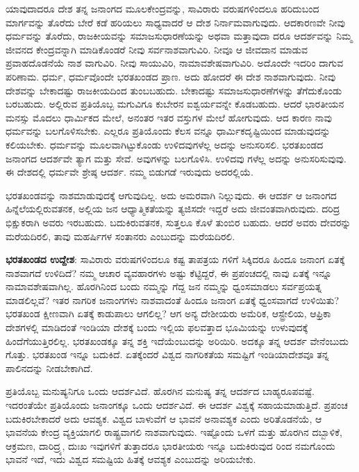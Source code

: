 ಯಾವುದಾದರೂ ದೇಶ ತನ್ನ ಜನಾಂಗದ ಮೂಲಕೇಂದ್ರವನ್ನು, ಸಾವಿರಾರು ವರುಷಗಳಿಂದಲೂ ಹರಿದುಬಂದ ಮಾರ್ಗವನ್ನು ತೊರೆದು ಬೇರೆ ಕಡೆ ಹರಿಯಲು ಸಾಧ್ಯವಾದರೆ ಆ ದೇಶ ನಿರ್ನಾಮವಾಗುವುದು. ಆದಕಾರಣವೇ ನೀವು ಧರ್ಮವನ್ನು ತೊರೆದು, ರಾಜಕೀಯವನ್ನು ಸಮಾಜಸುಧಾರಣೆಯನ್ನು ಅಥವಾ ಮತ್ತಾವುದಾ ದರೂ ಆದರ್ಶವನ್ನು ನಿಮ್ಮ ಜೀವನದ ಕೇಂದ್ರವನ್ನಾಗಿ ಮಾಡಿಕೊಂಡರೆ ನೀವು ಸರ್ವನಾಶವಾಗುವಿರಿ. ನೀವೂ ಆ ಜೀವದಾನ ಮಾಡುವ ಪ್ರವಾಹದೊಡನೆಯೆ ನಾಶ ವಾಗುವಿರಿ. ನೀವು ಸಾಯುವಿರಿ, ನಾಮಾವಶೇಷವಾಗುವಿರಿ. ಅದೊಂದೇ ಇದರಿಂ ದಾಗುವ ಪರಿಣಾಮ. ಧರ್ಮ, ಧರ್ಮವೊಂದೇ ಭರತಖಂಡದ ಪ್ರಾಣ. ಅದು ಹೋದರೆ ಈ ದೇಶ ನಾಶವಾಗುವುದು. ನೀವು ದೇಶವನ್ನು ಬೇಕಾದಷ್ಟು ರಾಜಕೀಯದಿಂದ ತುಂಬಬಹುದು. ಬೇಕಾದಷ್ಟು ಸಮಾಜಸುಧಾರಣೆಗಳನ್ನು ತೆಗೆದುಕೊಂಡು ಬರಬಹುದು. ಅಲ್ಲಿರುವ ಪ್ರತಿಯೊಬ್ಬ ಮಗುವಿಗೂ ಕುಬೇರನ ಐಶ್ವರ್ಯವನ್ನೇ ಕೊಡಬಹುದು. ಆದರೆ ಭಾರತೀಯನ ಮನಸ್ಸು ಮೊದಲು ಧಾರ್ಮಿಕದ ಮೇಲೆ, ಅನಂತರ ಇತರ ವಸ್ತುಗಳ ಮೇಲೆ ಹೋಗುವುದು. ಆದ ಕಾರಣ ನಾವು ಧರ್ಮವನ್ನು ಬಲಗೊಳಿಸಬೇಕು. ಎಲ್ಲರೂ ಪ್ರತಿಯೊಂದು ಕೆಲಸ ವನ್ನೂ ಧಾರ್ಮಿಕದೃಷ್ಟಿಯಿಂದ ಮಾಡುವುದನ್ನು ಕಲಿಯಬೇಕು. ಧರ್ಮವನ್ನು ಮೂಲವಾಗಿಟ್ಟುಕೊಂಡು ಉಳಿದವುಗಳೆಲ್ಲ ಅದನ್ನು ಅನುಸರಿಸಲಿ. ಭರತಖಂಡದ ಜನಾಂಗದ ಆದರ್ಶವೇ ತ್ಯಾಗ ಮತ್ತು ಸೇವೆ. ಅವುಗಳನ್ನು ಬಲಗೊಳಿಸಿ. ಉಳಿದವು ಗಳೆಲ್ಲ ಅದನ್ನು ಅನುಸರಿಸುವುವು. ಈ ದೇಶದಲ್ಲಿ ಧರ್ಮವೇ ಶ್ರೇಷ್ಠ ಆದರ್ಶ. ನಮ್ಮ ಬಿಡುಗಡೆ ಇರುವುದು ಅದರಲ್ಲಿಯೆ.

ಭರತಖಂಡವನ್ನು ನಾಶಮಾಡುವುದಕ್ಕೆ ಆಗುವುದಿಲ್ಲ. ಅದು ಅಮರವಾಗಿ ನಿಲ್ಲುವುದು. ಈ ಆದರ್ಶ ಆ ಜನಾಂಗದ ಹಿನ್ನೆಲೆಯಲ್ಲಿರುವತನಕ, ಅಲ್ಲಿಯ ಜನ ಆಧ್ಯಾತ್ಮಿಕತೆಯನ್ನು ತ್ಯಜಿಸದೇ ಇದ್ದರೆ ಅದು ಜೀವಂತವಾಗಿರುವುದು. ದರಿದ್ರ ಭಿಕ್ಷುಕರಾಗಿ ಅವರು ಇರಬಹುದು. ಬದುಕಿರುವತನಕ, ಸುತ್ತಲೂ ಕೊಳೆ ತುಂಬಿರ ಬಹುದು. ಆದರೆ ಅವರು ದೇವರನ್ನು ಮರೆಯದಿರಲಿ, ತಾವು ಮಹರ್ಷಿಗಳ ಸಂತಾನರು ಎಂಬುದನ್ನು ಮರೆಯದಿರಲಿ.

\textbf{ಭರತಖಂಡದ ಉದ್ದೇಶ}: ಸಾವಿರಾರು ವರುಷಗಳಿಂದಲೂ ಕಷ್ಟ ತಾಪತ್ರಯ ಗಳಿಗೆ ಸಿಕ್ಕಿದರೂ ಹಿಂದೂ ಜನಾಂಗ ಏತಕ್ಕೆ ನಾಶವಾಗದೆ ಉಳಿದಿದೆ? ನಮ್ಮ ಆಚಾರ ವ್ಯವಹಾರಗಳು ಅಷ್ಟು ಕೆಟ್ಟಿದ್ದರೆ, ಈ ಪ್ರಪಂಚದಲ್ಲಿ ನಾವು ಏತಕ್ಕೆ ಇನ್ನೂ ನಾಮಾವಶೇಷವಾಗಿಲ್ಲ. ಹೊರಗಿನಿಂದ ಬಂದು ನಮ್ಮನ್ನು ಗೆದ್ದ ಜನ ನಮ್ಮನ್ನು ಧ್ವಂಸಮಾಡಲು ಸರ್ವಪ್ರಯತ್ನ ಮಾಡಲಿಲ್ಲವೆ? ಇತರ ನಾಗರಿಕ ಜನಾಂಗಗಳು ನಾಶವಾದಂತೆ ಹಿಂದೂ ಜನಾಂಗ ಏತಕ್ಕೆ ಧ್ವಂಸವಾಗದೆ ಉಳಿಯಿತು? ಭರತಖಂಡ ಕ್ಷೀಣವಾಗಿ ಏತಕ್ಕೆ ಕಾಡುಪಾಲು ಆಗಲಿಲ್ಲ? ಆಗ ಅನ್ಯ ದೇಶೀಯರು ಅಮೆರಿಕ, ಆಸ್ಟ್ರೇಲಿಯ, ಆಫ್ರಿಕಾ ದೇಶಗಳಲ್ಲಿ ಮಾಡಿದಂತೆ ಇಂಡಿಯಾ ದೇಶಕ್ಕೆ ಬಂದು ಇಲ್ಲಿಯ ಫಲವತ್ತಾದ ಭೂಮಿಯನ್ನು ಉಳುವುದಕ್ಕೆ ಹಿಂದೆಗೆಯುತ್ತಿರಲಿಲ್ಲ. ಭರತಖಂಡಕ್ಕೂ ತನ್ನ ಶಕ್ತಿ ಇದೆಯೆಂಬುದನ್ನು ಅರಿಯಿರಿ. ಅದಕ್ಕೂ ತನ್ನ ಆದರ್ಶ ವೇನೆಂಬುದು ಗೊತ್ತು. ಭರತಖಂಡ ಇನ್ನೂ ಬದುಕಿದೆ. ಏತಕ್ಕೆಂದರೆ ವಿಶ್ವದ ನಾಗರಿಕತೆಯ ಸಮಷ್ಟಿಗೆ ಇಂಡಿಯಾದೇಶವೂ ತನ್ನ ಪಾಲಿನದನ್ನು ನೀಡಬೇಕಾಗಿದೆ. 

ಪ್ರತಿಯೊಬ್ಬ ಮನುಷ್ಯನಿಗೂ ಒಂದು ಆದರ್ಶವಿದೆ. ಹೊರಗಿನ ಮನುಷ್ಯ ತನ್ನ ಆದರ್ಶದ ಬಾಹ್ಯರೂಪವಷ್ಟೆ. ಇದರಂತೆಯೇ ಪ್ರತಿಯೊಂದು ಜನಾಂಗಕ್ಕೂ ಒಂದು ಆದರ್ಶವಿದೆ. ಈ ಆದರ್ಶ ವಿಶ್ವಕ್ಕೆ ಸಹಾಯಮಾಡುತ್ತಿದೆ. ಪ್ರಪಂಚ ಬದುಕಿರಬೇಕಾದರೆ ಅದು ಆವಶ್ಯಕ. ವಿಶ್ವದ ಬಾಳುವೆಗೆ ಆ ಭಾವನೆ ಅನಾವಶ್ಯಕ ಎಂದು ಅರಿತೊಡನೆಯೆ, ಆ ಭಾವನೆಯ ಕೇಂದ್ರ ವ್ಯಕ್ತಿಯಾಗಲಿ ರಾಷ್ಟ್ರವಾಗಲಿ ನಾಶವಾಗುವುದು. ಇಷ್ಟೊಂದು ಒಳಗೆ ಮತ್ತು ಹೊರಗಿನ ದಬ್ಬಾಳಿಕೆ, ಆಕ್ರಮಣ, ದಾರಿದ್ರ್ಯ, ದುಃಖ ಇವುಗಳಿಗೆ ತುತ್ತಾದರೂ ಭಾರತೀಯರು ಇನ್ನೂ ಬದುಕಿರುವುದ ರಿಂದ ನಮಗೊಂದು ಭಾವನೆ ಇದೆ, ಇದು ವಿಶ್ವದ ಸಮಷ್ಟಿಯ ಹಿತಕ್ಕೆ ಆವಶ್ಯಕ ಎಂಬುದನ್ನು ಅರಿಯಬೇಕು.

